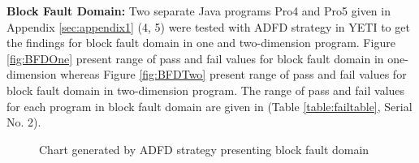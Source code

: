 

\noindent \textbf{Block Fault Domain:}  Two separate Java programs Pro4 and Pro5 given in Appendix \ref{sec:appendix1} (4, 5) were tested with ADFD strategy in YETI to get the findings for block fault domain in one and two-dimension program. Figure \ref{fig:BFDOne} present range of pass and fail values for block fault domain in one-dimension whereas Figure \ref{fig:BFDTwo} present range of pass and fail values for block fault domain in two-dimension program. The range of pass and fail values for each program in block fault domain are given in (Table \ref{table:failtable}, Serial No. 2).





\begin{figure} [H]



\caption{Chart generated by ADFD strategy presenting block fault domain}
\end{figure}




